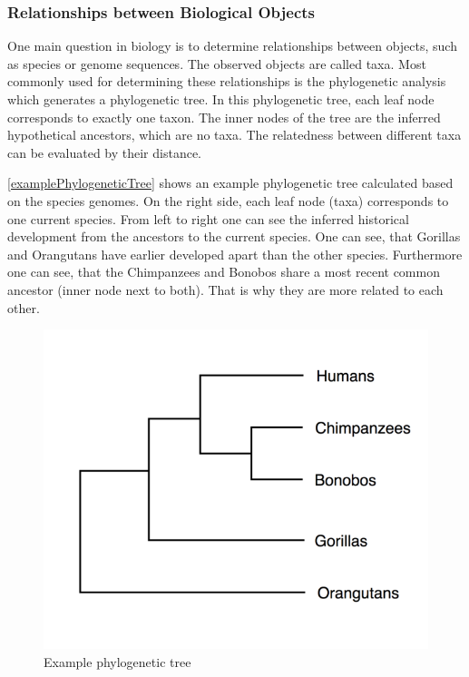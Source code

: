 \subsubsection{Relationships between Biological Objects} \label{fundamentalsAd}

One main question in biology is to determine relationships between objects, such as species or genome sequences. The observed objects are called taxa. Most commonly used for determining these relationships is the phy\-lo\-ge\-ne\-tic analysis which generates a phy\-lo\-ge\-ne\-tic tree. In this phy\-lo\-ge\-ne\-tic tree, each leaf node corresponds to exactly one taxon. The inner nodes of the tree are the inferred hypothetical ancestors, which are no taxa. The relatedness between different taxa can be evaluated by their distance. \cite{böckenhauer2013algorithmische}

\autoref{examplePhylogeneticTree} shows an example phylogenetic tree calculated based on the species genomes. On the right side, each leaf node (taxa) corresponds to one current species. From left to right one can see the inferred historical development from the ancestors to the current species. One can see, that Gorillas and Orangutans have earlier developed apart than the other species. Furthermore one can see, that the  Chimpanzees and Bonobos share a most recent common ancestor (inner node next to both). That is why they are more related to each other. \cite{mallawaarachchiMolecularPhylogeneticsUsing2018}

\begin{figure}[ht]
	\centering
	\includegraphics[width=0.5\linewidth]{figures/examplePhylogeneticTree.png}
	\caption{Example phylogenetic tree \cite{mallawaarachchiMolecularPhylogeneticsUsing2018}}
	\label{examplePhylogeneticTree}
\end{figure}

\newpage